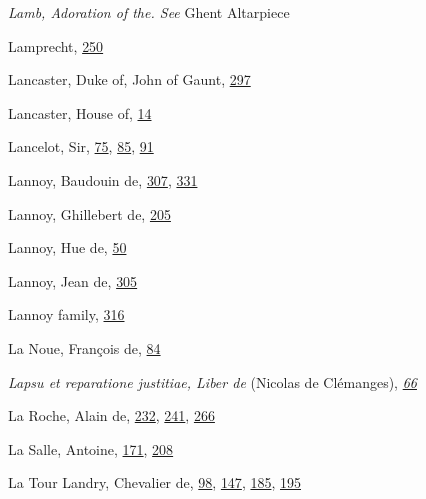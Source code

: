 \emph{Lamb, Adoration of the. See} Ghent Altarpiece

Lamprecht,
\protect\hyperlink{17_Chapter_Ten__THE_FAILURE_OF_IMAG.xhtmlux5cux23page_250}{250}

Lancaster, Duke of, John of Gaunt,
\protect\hyperlink{19_Chapter_Twelve__ART_IN_LIFE.xhtmlux5cux23page_297}{297}

Lancaster, House of,
\protect\hyperlink{08_Chapter_One__THE_PASSIONATE_INTE.xhtmlux5cux23page_14}{14}

Lancelot, Sir,
\protect\hyperlink{10_Chapter_Three__THE_HEROIC_DREAM.xhtmlux5cux23page_75}{75},
\protect\hyperlink{10_Chapter_Three__THE_HEROIC_DREAM.xhtmlux5cux23page_85}{85},
\protect\hyperlink{10_Chapter_Three__THE_HEROIC_DREAM.xhtmlux5cux23page_91}{91}

Lannoy, Baudouin de,
\protect\hyperlink{20_ILLUSTRATIONS_FOLLOW_PAGE.xhtmlux5cux23page_307}{307},
\protect\hyperlink{21_Chapter_Thirteen__IMAGE_AND_WORD.xhtmlux5cux23page_331}{331}

Lannoy, Ghillebert de,
\protect\hyperlink{14_Chapter_Seven__THE_PIOUS_PERSONA.xhtmlux5cux23page_205}{205}

Lannoy, Hue de,
\protect\hyperlink{09_Chapter_Two__THE_CRAVING_FOR_A_M.xhtmlux5cux23page_50}{50}

Lannoy, Jean de,
\protect\hyperlink{20_ILLUSTRATIONS_FOLLOW_PAGE.xhtmlux5cux23page_305}{305}

Lannoy family,
\protect\hyperlink{20_ILLUSTRATIONS_FOLLOW_PAGE.xhtmlux5cux23page_316}{316}

La Noue, François de,
\protect\hyperlink{10_Chapter_Three__THE_HEROIC_DREAM.xhtmlux5cux23page_84}{84}

\emph{Lapsu et reparatione justitiae, Liber de} (Nicolas de Clémanges),
\emph{\protect\hyperlink{10_Chapter_Three__THE_HEROIC_DREAM.xhtmlux5cux23page_66}{66}}

La Roche, Alain de,
\protect\hyperlink{15_Chapter_Eight__RELIGIOUS_EXCITAT.xhtmlux5cux23page_232}{232},
\protect\hyperlink{16_Chapter_Nine__THE_DECLINE_OF_SYM.xhtmlux5cux23page_241}{241},
\protect\hyperlink{17_Chapter_Ten__THE_FAILURE_OF_IMAG.xhtmlux5cux23page_266}{266}

La Salle, Antoine,
\protect\hyperlink{12_Chapter_Five__THE_VISION_OF_DEAT.xhtmlux5cux23page_171}{171},
\protect\hyperlink{14_Chapter_Seven__THE_PIOUS_PERSONA.xhtmlux5cux23page_208}{208}

La Tour Landry, Chevalier de,
\protect\hyperlink{10_Chapter_Three__THE_HEROIC_DREAM.xhtmlux5cux23page_98}{98},
\protect\hyperlink{11_Chapter_Four__THE_FORMS_OF_LOVE.xhtmlux5cux23page_147}{147},
\protect\hyperlink{13_Chapter_Six__THE_DEPICTION_OF_TH.xhtmlux5cux23page_185}{185},
\protect\hyperlink{13_Chapter_Six__THE_DEPICTION_OF_TH.xhtmlux5cux23page_195}{195}

